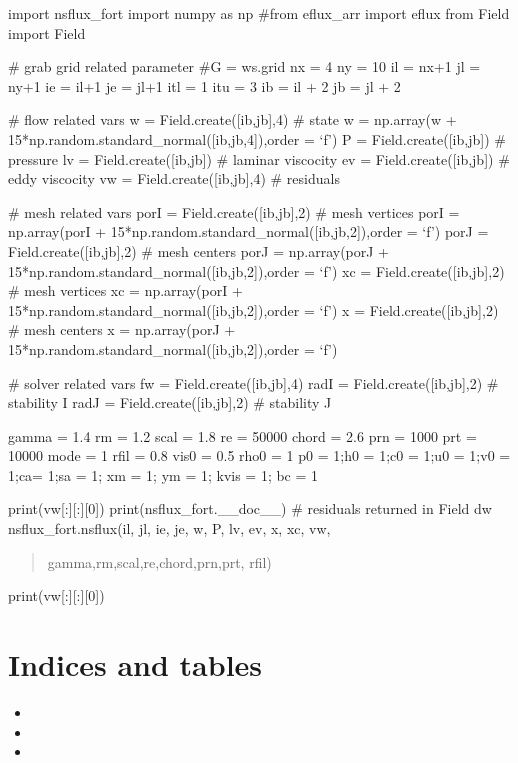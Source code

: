 \documentclass[letterpaper,10pt,english]{sphinxmanual}
\begin{document}
\sphinxAtStartPar
import nsflux\_fort
import numpy as np
\#from eflux\_arr import eflux
from Field import Field

\sphinxAtStartPar
\# grab grid related parameter
\#G = ws.grid
nx = 4
ny = 10
il = nx+1
jl = ny+1
ie = il+1
je = jl+1
itl = 1
itu = 3
ib = il + 2
jb = jl + 2

\sphinxAtStartPar
\# flow related vars
w = Field.create({[}ib,jb{]},4) \# state
w = np.array(w + 15*np.random.standard\_normal({[}ib,jb,4{]}),order = ‘f’)
P = Field.create({[}ib,jb{]}) \# pressure
lv = Field.create({[}ib,jb{]}) \# laminar viscocity
ev = Field.create({[}ib,jb{]}) \# eddy viscocity
vw = Field.create({[}ib,jb{]},4) \# residuals

\sphinxAtStartPar
\# mesh related vars
porI = Field.create({[}ib,jb{]},2) \# mesh vertices
porI = np.array(porI + 15*np.random.standard\_normal({[}ib,jb,2{]}),order = ‘f’)
porJ = Field.create({[}ib,jb{]},2) \# mesh centers
porJ = np.array(porJ + 15*np.random.standard\_normal({[}ib,jb,2{]}),order = ‘f’)
xc = Field.create({[}ib,jb{]},2) \# mesh vertices
xc = np.array(porI + 15*np.random.standard\_normal({[}ib,jb,2{]}),order = ‘f’)
x = Field.create({[}ib,jb{]},2) \# mesh centers
x = np.array(porJ + 15*np.random.standard\_normal({[}ib,jb,2{]}),order = ‘f’)

\sphinxAtStartPar
\# solver related vars
fw = Field.create({[}ib,jb{]},4)
radI = Field.create({[}ib,jb{]},2) \# stability I
radJ = Field.create({[}ib,jb{]},2) \# stability J

\sphinxAtStartPar
gamma = 1.4
rm = 1.2
scal = 1.8
re = 50000
chord = 2.6
prn = 1000
prt = 10000
mode = 1
rfil = 0.8
vis0 = 0.5
rho0 = 1
p0 = 1;h0 = 1;c0 = 1;u0 = 1;v0 = 1;ca= 1;sa = 1; xm = 1; ym = 1; kvis = 1; bc = 1

\sphinxAtStartPar
print(vw{[}:{]}{[}:{]}{[}0{]})
print(nsflux\_fort.\_\_doc\_\_)
\# residuals returned in Field dw
nsflux\_fort.nsflux(il, jl, ie, je,       w, P, lv, ev,        x, xc,       vw,
\begin{quote}

\sphinxAtStartPar
gamma,rm,scal,re,chord,prn,prt,       rfil)
\end{quote}

\sphinxAtStartPar
print(vw{[}:{]}{[}:{]}{[}0{]})


\chapter{Indices and tables}
\label{\detokenize{index:indices-and-tables}}\begin{itemize}
\item {} 
\sphinxAtStartPar
{}

\item {} 
\sphinxAtStartPar
{}

\item {} 
\sphinxAtStartPar
{}

\end{itemize}
\end{document}
